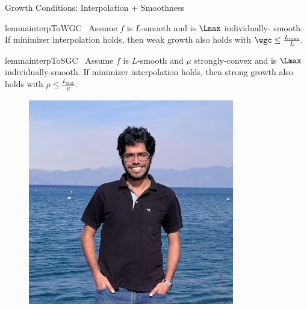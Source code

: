 \documentclass[mathserif,notheorems, hyperref={colorlinks, citecolor=blue, urlcolor=blue, linkcolor=blue}]{beamer}
\begin{document}
    \begin{frame}{Growth Conditions: Interpolation + Smoothness}
    \begin{center}
            
        \vspace{-2ex}
        \begin{minipage}[t]{0.82\textwidth}
            \vspace{-1.45ex}
            \begin{restatable}{lemma}{interpToWGC}~\label{lemma:interpolation-to-wgc}
                Assume \( f \) is \( L \)-smooth and \oracle{} is \( \Lmax \) individually- smooth. 
                If minimizer interpolation holds, then weak growth also holds with
                \( \wgc \leq \frac{L_{\text{max}}}{L}. \)
            \end{restatable}
           

            \begin{restatable}{lemma}{interpToSGC}~\label{lemma:interpolation-to-sgc}
                Assume \( f \) is \( L \)-smooth and \( \mu \) strongly-convex and \oracle{} is \( \Lmax \) individually-smooth. 
                If minimizer interpolation holds, then strong growth also holds with 
                \( \rho \leq \frac{L_{\text{max}}}{\mu}. \)
            \end{restatable}
        \end{minipage}
        \begin{minipage}[t]{0.15\textwidth}
            \begin{figure}[t]
                \centering
                \includegraphics[width=0.8\textwidth]{collaborators/sharan}


\end{figure}
\end{minipage}
\end{center}
\end{frame}
\end{document}
